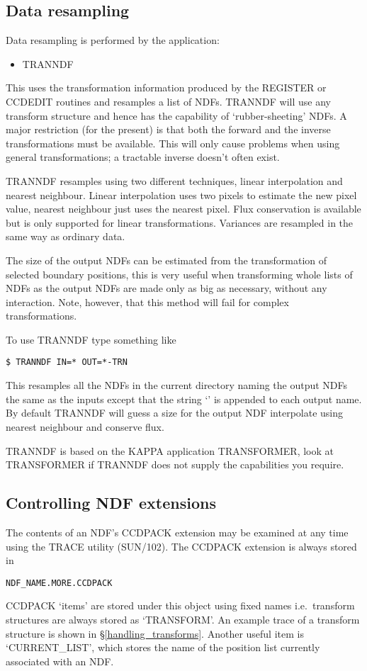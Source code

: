\subsection{Data resampling}
Data resampling is performed by the application:
\begin{itemize}
\item TRANNDF
\end{itemize}
This uses the transformation information produced by the REGISTER or
CCDEDIT routines and resamples a list of NDFs. TRANNDF will use any
transform structure and hence has the capability of `rubber-sheeting'
NDFs. A major restriction (for the present) is that both the forward and
the inverse transformations must be available. This will only cause
problems when using general transformations; a tractable inverse doesn't
often exist.

TRANNDF resamples using two different techniques, linear interpolation
and nearest neighbour. Linear interpolation uses two pixels to estimate
the new pixel value, nearest neighbour just uses the nearest pixel. Flux
conservation is available but is only supported for linear 
transformations. Variances are resampled in the same way as ordinary
data.

The size of the output NDFs can be estimated from the transformation of
selected boundary positions, this is very useful when transforming whole
lists of NDFs as the output NDFs are made only as big as necessary,
without any interaction. Note, however, that this method will fail for
complex transformations.

To use TRANNDF type something like
\begin{myquote}
\begin{verbatim}
$ TRANNDF IN=* OUT=*-TRN 
\end{verbatim}
\end{myquote}
This resamples all the NDFs in the current directory naming the output
NDFs the same as the inputs except that the string `' is
appended to each output name. By default TRANNDF will guess a size for
the output NDF interpolate using nearest neighbour and conserve flux.

TRANNDF is based on the KAPPA application TRANSFORMER, look at
TRANSFORMER if TRANNDF does not supply the capabilities you require.

\subsection{Controlling NDF extensions}
The contents of an NDF's CCDPACK extension may be examined at any time
using the TRACE utility (SUN/102). The CCDPACK extension is always
stored in 
\begin{myquote}
\begin{verbatim}
NDF_NAME.MORE.CCDPACK
\end{verbatim}
\end{myquote}
CCDPACK `items' are stored under this object using fixed names i.e.\
transform structures are always stored as `TRANSFORM'. An example trace
of a transform structure is shown in \S\ref{handling_transforms}.
Another useful item is `CURRENT\_LIST', which stores the name of the
position list currently associated with an NDF.

